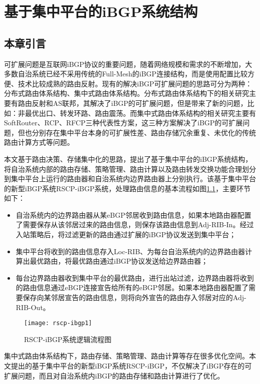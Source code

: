 \chapter{基于集中平台的iBGP系统结构}
\label{cha:architecture}


\section{本章引言}
可扩展问题是互联网iBGP协议的重要问题，随着网络规模和需求的不断增加，大多数自治系统已经不采用传统的Full-Mesh的iBGP连接结构，而是使用配置比较方便、技术比较成熟的路由反射。现有的解决iBGP可扩展问题的思路可分为两种：分布式路由体系结构、集中式路由体系结构。分布式路由体系结构下的相关研究主要有路由反射和AS联邦，其解决了iBGP的可扩展问题，但是带来了新的问题，比如：非最优出口、转发环路、路由震荡。而集中式路由体系结构的相关研究主要有SoftRouter、RCP、RFCP三种代表性方案，这三种方案解决了iBGP的可扩展问题，但也分别存在集中平台本身的可扩展性差、路由存储冗余重复、未优化的传统路由计算方式等问题。

本文基于路由决策、存储集中化的思路，提出了基于集中平台的iBGP系统结构，将自治系统内部的路由存储、策略管理、路由计算以及路由转发交换功能合理划分到集中平台上运行的路由器和自治系统内边界路由器上分别执行。该基于集中平台的新型iBGP系统RSCP-iBGP系统，处理路由信息的基本流程如图\ref{fig:rscp-ibgp1}，主要环节如下：
\begin{itemize}
  \item 自治系统内的边界路由器从某eBGP邻居收到路由信息，如果本地路由器配置了需要保存从该邻居过来的路由信息，则保存该路由信息到Adj-RIB-In。经过入站策略后，将过滤更新的路由通过扩展的iBGP协议发送到集中平台；
  \item 集中平台将收到的路由信息存入Loc-RIB、为每台自治系统内的边界路由器计算出最优路由，将最优路由通过iBGP协议发送给边界路由器；
  \item 每台边界路由器收到集中平台的最优路由，进行出站过滤，边界路由器将收到的路由信息通过eBGP连接宣告给所有的eBGP邻居。如果本地路由器配置了需要保存向某邻居宣告的路由信息，则将向外宣告的路由存入邻居对应的Adj-RIB-Out。
\end{itemize}

\begin{figure}
  \centering
  \texttt{[image: rscp-ibgp1]}
  \caption{RSCP-iBGP系统逻辑流程图}
  \label{fig:rscp-ibgp1}
\end{figure}

集中式路由体系结构下，路由存储、策略管理、路由计算等存在很多优化空间。本文提出的基于集中平台的新型iBGP系统RSCP-iBGP，不仅解决了iBGP存在的可扩展问题，而且对自治系统内iBGP的路由存储和路由计算进行了优化。

